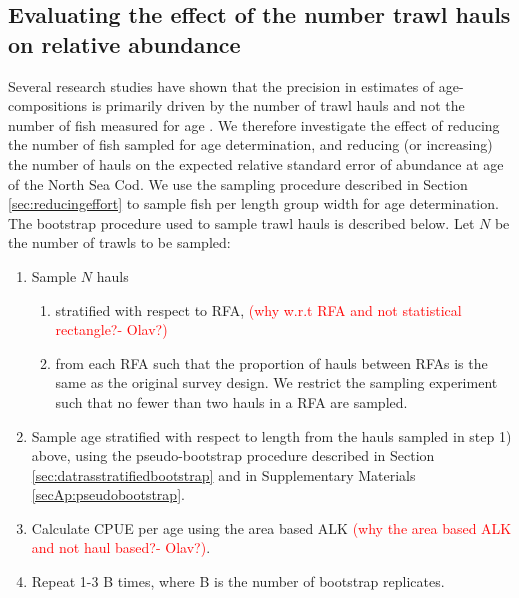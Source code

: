 \documentclass[a4paper 12pt]{article}
\numberwithin{equation}{section}
\newcommand{\ed}[1]{\textcolor{red}{#1}}
\begin{document}
\subsection{Evaluating the effect of the number trawl hauls on relative abundance}
\label{sec:evaluatingtrawlhauls}
Several research studies have shown that the precision in estimates of age-compositions is primarily driven by the number of trawl hauls and not the number of fish measured for age \citep{aanes2015efficient, sondre2003estimating, stewart2014bootstrapping}. We therefore investigate the effect of reducing the number of fish sampled for age determination, and reducing (or increasing) the number of hauls on the expected relative standard error of abundance at age of the North Sea Cod. We use the sampling procedure described in Section \ref{sec:reducingeffort} to sample fish per length group width for age determination. The bootstrap procedure used to sample trawl hauls is described below. Let $N$ be the number of trawls to be sampled:
\begin{enumerate}
\item Sample $N$ hauls
     \begin{enumerate}
      \item stratified with respect to RFA, \ed{(why w.r.t RFA and not statistical rectangle?- Olav?)}
      \item from each RFA such that the proportion of hauls between RFAs is the same as the original survey design. We restrict the sampling experiment such that no fewer than two hauls in a RFA are sampled.
      \end{enumerate} 
\item Sample age stratified with respect to length from the hauls sampled in step 1) above, using the pseudo-bootstrap procedure described in Section \ref{sec:datrasstratifiedbootstrap} and in Supplementary Materials \ref{secAp:pseudobootstrap}.
\item Calculate CPUE per age using the area based ALK \ed{(why the area based ALK and not haul based?- Olav?)}.
\item Repeat 1-3 B times, where B is the number of bootstrap replicates.
\end{enumerate}
\end{document}
